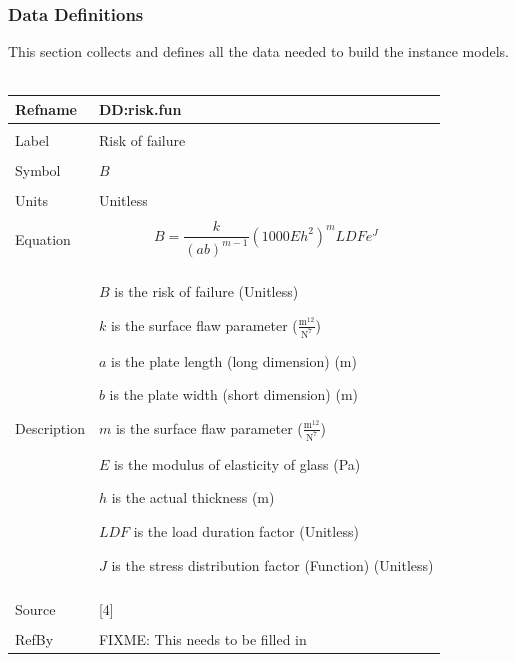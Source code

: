 \documentclass[12pt]{article}
\begin{document}
\subsubsection{Data Definitions}
\label{Sec:DDs}
This section collects and defines all the data needed to build the instance models.
~\newline
\noindent \begin{minipage}{\textwidth}
\begin{tabular}{p{} p{}}
\toprule \textbf{Refname} & \textbf{DD:risk.fun}
\label{DD:risk.fun}
\\ \midrule \\
Label & Risk of failure
\\ \midrule \\
Symbol & $B$
\\ \midrule \\
Units & Unitless
\\ \midrule \\
Equation & \begin{dmath}
           B=\frac{k}{\left(a b\right)^{m-1}} \left(1000 E h^{2}\right)^{m} LDF e^{J}
           \end{dmath}
\\ \midrule \\
Description & \begin{description}
              \item{$B$ is the risk of failure (Unitless)}
              \item{$k$ is the surface flaw parameter ($\frac{\text{m}^{12}}{\text{N}^{7}}$)}
              \item{$a$ is the plate length (long dimension) (m)}
              \item{$b$ is the plate width (short dimension) (m)}
              \item{$m$ is the surface flaw parameter ($\frac{\text{m}^{12}}{\text{N}^{7}}$)}
              \item{$E$ is the modulus of elasticity of glass (Pa)}
              \item{$h$ is the actual thickness (m)}
              \item{$LDF$ is the load duration factor (Unitless)}
              \item{$J$ is the stress distribution factor (Function) (Unitless)}
              \end{description}
\\ \midrule \\
Source & [4]
\\ \midrule \\
RefBy & FIXME: This needs to be filled in
\\ \bottomrule \end{tabular}
\end{minipage}\\
\end{document}
